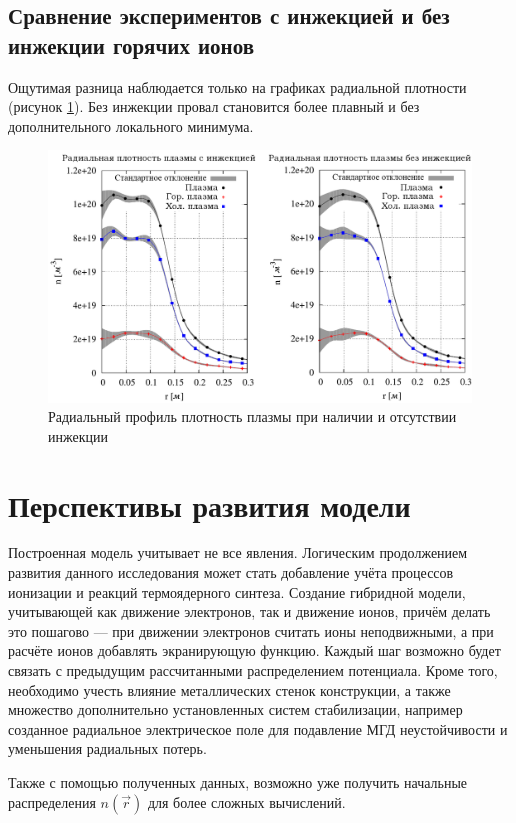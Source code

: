\subsection{Сравнение экспериментов с инжекцией и без инжекции горячих ионов}

Ощутимая разница наблюдается только на графиках радиальной плотности (рисунок \ref{fig:density_r_w}). Без инжекции провал становится более плавный и без дополнительного локального минимума.

\begin{figure}[h!]
	\center
	\includegraphics[width=1.\linewidth]{fig/ch5/density_comp}
	\caption{Радиальный профиль плотность плазмы при наличии и отсутствии инжекции}
	\label{fig:density_r_w}
\end{figure}

\section{Перспективы развития модели}

Построенная модель учитывает не все явления. Логическим продолжением развития данного исследования может стать добавление учёта процессов ионизации и реакций термоядерного синтеза. Создание гибридной модели, учитывающей как движение электронов, так и движение ионов, причём делать это пошагово --- при движении электронов считать ионы неподвижными, а при расчёте ионов добавлять экранирующую функцию. Каждый шаг возможно будет связать с предыдущим рассчитанными распределением потенциала. Кроме того, необходимо учесть влияние металлических стенок конструкции, а также множество дополнительно установленных систем стабилизации, например созданное радиальное электрическое поле для подавление МГД неустойчивости и уменьшения радиальных потерь.

Также с помощью полученных данных, возможно уже получить начальные распределения $n(\vec{r})$ для более сложных вычислений.
